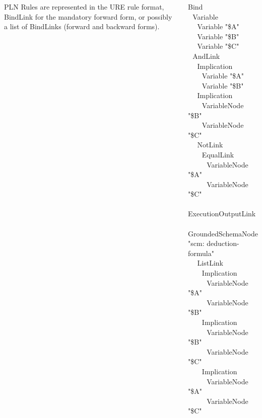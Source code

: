 \documentclass{beamer}
\begin{document}
\frame
{

  \begin{columns}

    \column{2in}

    PLN Rules are represented in the URE rule format, BindLink for the
    mandatory forward form, or possibly a list of BindLinks (forward and
    backward forms).

    \column{2in}  

{\tiny


    
  Bind\\
  $\ \ \ $Variable\\
  $\ \ \ $$\ \ \ $Variable "\$A"\\
  $\ \ \ $$\ \ \ $Variable "\$B"\\
  $\ \ \ $$\ \ \ $Variable "\$C"\\
  $\ \ \ $AndLink\\
  $\ \ \ $$\ \ \ $Implication\\
  $\ \ \ $$\ \ \ $$\ \ \ $Variable "\$A"\\
  $\ \ \ $$\ \ \ $$\ \ \ $Variable "\$B"\\
  $\ \ \ $$\ \ \ $Implication\\
  $\ \ \ $$\ \ \ $$\ \ \ $VariableNode "\$B"\\
  $\ \ \ $$\ \ \ $$\ \ \ $VariableNode "\$C"\\
  $\ \ \ $$\ \ \ $NotLink\\
  $\ \ \ $$\ \ \ $$\ \ \ $EqualLink\\
  $\ \ \ $$\ \ \ $$\ \ \ $$\ \ \ $VariableNode "\$A"\\
  $\ \ \ $$\ \ \ $$\ \ \ $$\ \ \ $VariableNode "\$C"\\
  $\ \ \ $ExecutionOutputLink\\
  $\ \ \ $$\ \ \ $GroundedSchemaNode "scm: deduction-formula"\\
  $\ \ \ $$\ \ \ $ListLink\\
  $\ \ \ $$\ \ \ $$\ \ \ $Implication\\
  $\ \ \ $$\ \ \ $$\ \ \ $$\ \ \ $VariableNode "\$A"\\
  $\ \ \ $$\ \ \ $$\ \ \ $$\ \ \ $VariableNode "\$B"\\
  $\ \ \ $$\ \ \ $$\ \ \ $Implication\\
  $\ \ \ $$\ \ \ $$\ \ \ $$\ \ \ $VariableNode "\$B"\\
  $\ \ \ $$\ \ \ $$\ \ \ $$\ \ \ $VariableNode "\$C"\\
  $\ \ \ $$\ \ \ $$\ \ \ $Implication\\
  $\ \ \ $$\ \ \ $$\ \ \ $$\ \ \ $VariableNode "\$A"\\
  $\ \ \ $$\ \ \ $$\ \ \ $$\ \ \ $VariableNode "\$C"\\

  }

  \end{columns}

}
\end{document}
